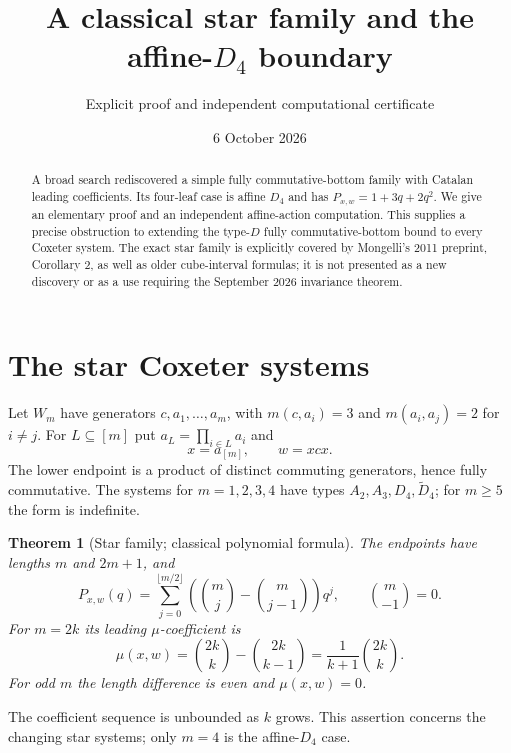 \documentclass[11pt]{article}
\title{A classical star family and the affine-$D_4$ boundary}
\author{Explicit proof and independent computational certificate}
\date{6 October 2026}
\newtheorem{theorem}{Theorem}
\begin{document}
\maketitle
\begin{abstract}
A broad search rediscovered a simple fully commutative-bottom family with
Catalan leading coefficients. Its four-leaf case is affine $D_4$ and has
$P_{x,w}=1+3q+2q^2$. We give an elementary proof and an independent
affine-action computation. This supplies a precise obstruction to extending
the type-$D$ fully commutative-bottom bound to every Coxeter system. The
exact star family is explicitly covered by Mongelli's 2011 preprint,
Corollary 2, as well as older cube-interval formulas; it is not presented
as a new discovery or as a use requiring the
September 2026 invariance theorem.
\end{abstract}

\section{The star Coxeter systems}
Let $W_m$ have generators $c,a_1,\ldots,a_m$, with
$m(c,a_i)=3$ and $m(a_i,a_j)=2$ for $i\ne j$.
For $L\subseteq[m]$ put $a_L=\prod_{i\in L}a_i$ and
\[
 x=a_{[m]},\qquad w=xcx.
\]
The lower endpoint is a product of distinct commuting generators, hence
fully commutative. The systems for $m=1,2,3,4$ have types
$A_2,A_3,D_4,\widetilde D_4$; for $m\geq5$ the form is indefinite.

\begin{theorem}[Star family; classical polynomial formula]\label{thm:star}
The endpoints have lengths $m$ and $2m+1$, and
\[
 P_{x,w}(q)=\sum_{j=0}^{\lfloor m/2\rfloor}
 \left(\binom mj-\binom m{j-1}\right)q^j,
 \qquad \binom m{-1}=0.
\]
For $m=2k$ its leading $\mu$-coefficient is
\[
 \mu(x,w)=\binom{2k}{k}-\binom{2k}{k-1}
 =\frac{1}{k+1}\binom{2k}{k}.
\]
For odd $m$ the length difference is even and $\mu(x,w)=0$.
\end{theorem}
The coefficient sequence is unbounded as $k$ grows. This assertion concerns
the changing star systems; only $m=4$ is the affine-$D_4$ case.
\end{document}
